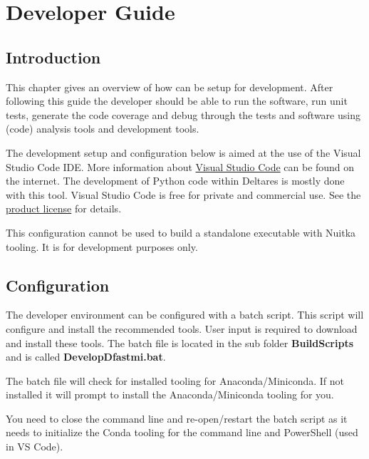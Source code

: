 \chapter{Developer Guide}\label{Chp:DevGuides}

\section{Introduction}

This chapter gives an overview of how \dfastmi can be setup for development.
After following this guide the developer should be able to run the software, run unit tests, generate the code coverage and debug through the tests and software using (code) analysis tools and development tools.

The development setup and configuration below is aimed at the use of the Visual Studio Code IDE.
More information about \href{https://code.visualstudio.com/}{Visual Studio Code} can be found on the internet.
The development of Python code within Deltares is mostly done with this tool.
Visual Studio Code is free for private and commercial use.
See the \href{https://code.visualstudio.com/license}{product license} for details.

\begin{Remark}
	\item This configuration cannot be used to build a standalone executable with Nuitka tooling.
	It is for development purposes only.
\end{Remark}

\section{Configuration}
The \dfastmi developer environment can be configured with a batch script.
This script will configure and install the recommended tools.
User input is required to download and install these tools.
The batch file is located in the sub folder \textbf{BuildScripts} and is called \textbf{DevelopDfastmi.bat}.

The batch file will check for installed tooling for Anaconda/Miniconda.
If not installed it will prompt to install the Anaconda/Miniconda tooling for you. 

\begin{Note}
You need to close the command line and re-open/restart the batch script as it needs to initialize the Conda tooling for the command line and PowerShell (used in VS Code).
\end{Note}

